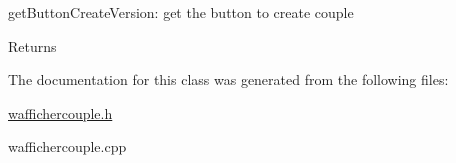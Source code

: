 get\+Button\+Create\+Version\+: get the button to create couple 

\begin{DoxyReturn}{Returns}

\end{DoxyReturn}


The documentation for this class was generated from the following files\+:\begin{DoxyCompactItemize}
\item 
\hyperlink{waffichercouple_8h}{waffichercouple.\+h}\item 
waffichercouple.\+cpp\end{DoxyCompactItemize}
